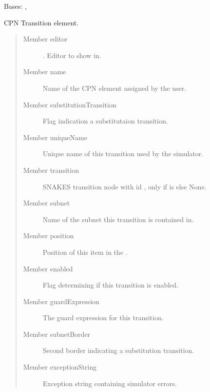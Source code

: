 \documentclass[a4paper,10pt,english]{sphinxmanual}
\begin{document}
\begin{fulllineitems}
\label{model_link:model.TransitionItem.TransitionItem}
Bases: , {\hyperref[model_link:model.AbstractItem.AbstractItem]{}}

CPN Transition element.
\begin{quote}\begin{description}
\item[{Member editor}] \leavevmode
{}. Editor to show in.

\item[{Member name}] \leavevmode
Name of the CPN element assigned by the user.

\item[{Member substitutionTransition}] \leavevmode
Flag indication a substitutaion transition.

\item[{Member uniqueName}] \leavevmode
Unique name of this transition used by the simulator.

\item[{Member transition}] \leavevmode
SNAKES transition node with id , only if  is  else None.

\item[{Member subnet}] \leavevmode
Name of the subnet this transition is contained in.

\item[{Member position}] \leavevmode
Position of this item in the .

\item[{Member enabled}] \leavevmode
Flag determining if this transition is enabled.

\item[{Member guardExpression}] \leavevmode
The guard expression for this transition.

\item[{Member subnetBorder}] \leavevmode
Second border indicating a substitution transition.

\item[{Member exceptionString}] \leavevmode
Exception string containing simulator errors.


\end{description}
\end{quote}
\end{fulllineitems}
\end{document}
